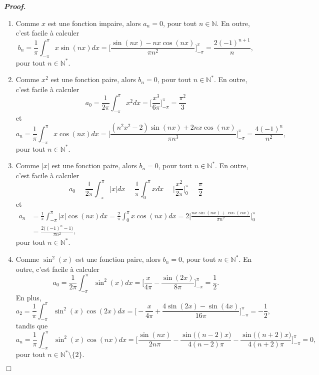 \documentclass[11pt,a4paper]{article}
\newcommand{\NN}{\mathbb{N}}
\newenvironment{preuve}[1][]
{\vskip 2mm  \noindent\emph{\bf Proof#1. }}{$\Box$ \vskip 2mm}
\begin{document}
	\begin{preuve}
		\begin{enumerate} 
			\item Comme $x$ est une fonction impaire, alors $a_{n} = 0$, pour tout $n \in \NN$. 
			En outre, c'est facile à calculer
			\[     b_{n} = \frac{1}{\pi} \int_{-\pi}^{\pi} x \sin(n x) dx = \bigg[ \frac{\sin(n x) - n x \cos(n x)}{\pi n^{2}} \bigg]_{-\pi}^{\pi} = \frac{2 (-1)^{n+1}}{n},     \]
			pour tout $n \in \NN^{*}$.
			
			\item Comme $x^{2}$ est une fonction paire, alors $b_{n} = 0$, pour tout $n \in \NN^{*}$. 
			En outre, c'est facile à calculer
			\[     a_{0} = \frac{1}{2\pi} \int_{-\pi}^{\pi} x^{2} dx = \bigg[ \frac{x^{3}}{6 \pi} \bigg]_{-\pi}^{\pi} = \frac{\pi^{2}}{3}     \]
			et
			\[     a_{n} = \frac{1}{\pi} \int_{-\pi}^{\pi} x \cos(n x) dx = \bigg[ \frac{(n^{2}x^{2}-2) \sin(n x) + 2 n x \cos(n x)}{\pi n^{3}} \bigg]_{-\pi}^{\pi} = \frac{4 (-1)^{n}}{n^{2}},     \]
			pour tout $n \in \NN^{*}$.
			
			\item Comme $|x|$ est une fonction paire, alors $b_{n} = 0$, pour tout $n \in \NN^{*}$. 
			En outre, c'est facile à calculer
			\[     a_{0} = \frac{1}{2\pi} \int_{-\pi}^{\pi} |x| dx = \frac{1}{\pi} \int_{0}^{\pi} x dx = \bigg[ \frac{x^{2}}{2 \pi} \bigg]_{0}^{\pi} = \frac{\pi}{2}     \]
			et
			\begin{align*}
			a_{n} &= \frac{1}{\pi} \int_{-\pi}^{\pi} |x| \cos(n x) dx = \frac{2}{\pi} \int_{0}^{\pi} x \cos(nx) dx = 2 \bigg[ \frac{n x \sin(n x) + \cos(n x)}{\pi n^{2}} \bigg]_{0}^{\pi} 
			\\
			&= \frac{2 \big((-1)^{n}-1\big)}{\pi n^{2}},
			\end{align*}
			pour tout $n \in \NN^{*}$.
			
			\item Comme $\sin^{2}(x)$ est une fonction paire, alors $b_{n} = 0$, pour tout $n \in \NN^{*}$. 
			En outre, c'est facile à calculer
			\[     a_{0} = \frac{1}{2\pi} \int_{-\pi}^{\pi} \sin^{2}(x) dx = \bigg[ \frac{x}{4 \pi} - \frac{\sin(2x)}{8 \pi} \bigg]_{-\pi}^{\pi} = \frac{1}{2}.     \]
			En plus, 
			\[     a_{2} = \frac{1}{\pi} \int_{-\pi}^{\pi} \sin^{2}(x) \cos(2 x) dx = \bigg[ -\frac{x}{4 \pi} + \frac{4 \sin(2 x) - \sin(4 x)}{16 \pi} \bigg]_{-\pi}^{\pi} = - \frac{1}{2},     \]
			tandis que 
			\[     a_{n} = \frac{1}{\pi} \int_{-\pi}^{\pi} \sin^{2}(x) \cos(n x) dx = \bigg[\frac{\sin(n x)}{2 n \pi} - \frac{\sin\big((n-2) x\big)}{4 (n-2) \pi} - \frac{\sin\big((n+2) x\big)}{4 (n+2) \pi} \bigg]_{-\pi}^{\pi} = 0,     \]
			pour tout $n \in \NN^{*} \setminus \{ 2 \}$.
			

\end{enumerate}
\end{preuve}
\end{document}
